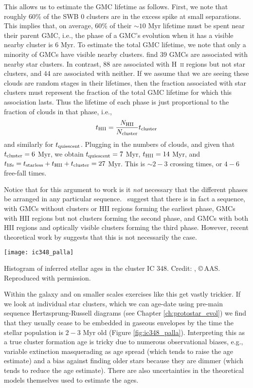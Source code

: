 This allows us to estimate the GMC lifetime as follows. First, we note that roughly 60\% of the SWB 0 clusters are in the excess spike at small separations. This implies that, on average, 60\% of their $\sim 10$ Myr lifetime must be spent near their parent GMC, i.e., the phase of a GMC's evolution when it has a visible nearby cluster is 6 Myr. To estimate the total GMC lifetime, we note that only a minority of GMCs have visible nearby clusters. \citet{kawamura09a} find 39 GMCs are associated with nearby star clusters. In contrast, 88 are associated with H~\textsc{ii} regions but not star clusters, and 44 are associated with neither. If we assume that we are seeing these clouds are random stages in their lifetimes, then the fraction associated with star clusters must represent the fraction of the total GMC lifetime for which this association lasts. Thus the lifetime of each phase is just proportional to the fraction of clouds in that phase, i.e.,
\begin{equation}
t_{\rm HII} = \frac{N_{\rm HII}}{N_{\rm cluster}} t_{\rm cluster}
\end{equation}
and similarly for $t_{\rm quiescent}$.
Plugging in the numbers of clouds, and given that $t_{\rm cluster}=6$ Myr, we obtain $t_{\rm quiescent} = 7$ Myr, $t_{\rm HII} = 14$ Myr, and $t_{\rm life} = t_{\rm starless} + t_{\rm HII} + t_{\rm cluster} = 27$ Myr. This is $\sim 2-3$ crossing times, or $4-6$ free-fall times.

Notice that for this argument to work is it {\it not} necessary that the different phases be arranged in any particular sequence. \citeauthor{kawamura09a}~suggest that there is in fact a sequence, with GMCs without clusters or HII regions forming the earliest phase, GMCs with HII regions but not clusters forming the second phase, and GMCs with both HII regions and optically visible clusters forming the third phase. However, recent theoretical work by \citet{goldbaum11a} suggests that this is not necessarily the case.

\begin{marginfigure}
\texttt{[image: ic348\_palla]}
\caption[Histogram of stellar ages in IC 348]{
\label{fig:ic348_palla}
Histogram of inferred stellar ages in the cluster IC 348. Credit: \citet{palla00a}, \copyright\,AAS. Reproduced with permission.
}
\end{marginfigure}

Within the galaxy and on smaller scales exercises like this get vastly trickier. If we look at individual star clusters, which we can age-date using pre-main sequence Hertzsprung-Russell diagrams (see Chapter \ref{ch:protostar_evol}) we find that they usually cease to be embedded in gaseous envelopes by the time the stellar population is $2-3$ Myr old (Figure \ref{fig:ic348_palla}). Interpreting this as a true cluster formation age is tricky due to numerous observational biases, e.g., variable extinction masquerading as age spread (which tends to raise the age estimate) and a bias against finding older stars because they are dimmer (which tends to reduce the age estimate). There are also uncertainties in the theoretical models themselves used to estimate the ages.

